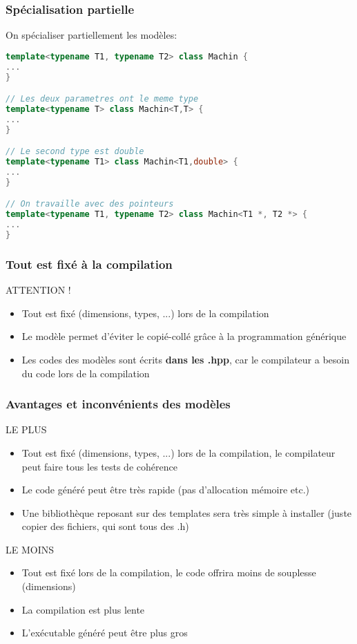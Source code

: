 \documentclass{beamer}
\begin{document}
\begin{frame}[fragile=singleslide,shrink=20]
\frametitle {Spécialisation partielle}

On spécialiser partiellement les modèles:

\begin{lstlisting}[language=c++]
template<typename T1, typename T2> class Machin {
...
}

// Les deux parametres ont le meme type
template<typename T> class Machin<T,T> {
...
}

// Le second type est double
template<typename T1> class Machin<T1,double> {
...
}

// On travaille avec des pointeurs
template<typename T1, typename T2> class Machin<T1 *, T2 *> {
...
}
\end{lstlisting}

\end{frame}

\begin{frame}
\frametitle {Tout est fixé à la compilation}

\begin{block}{ATTENTION !}
\begin{itemize}
\item{Tout est fixé (dimensions, types, ...) lors de la compilation}
\item{Le modèle permet d'éviter le copié-collé grâce à la programmation générique}
\item{Les codes des modèles sont écrits \textbf{dans les .hpp}, car le compilateur a besoin du code lors de la compilation}
\end{itemize}
\end{block}

\end{frame}

\begin{frame}
\frametitle {Avantages et inconvénients des modèles}

\begin{block}{LE PLUS}
\begin{itemize}
\item{Tout est fixé (dimensions, types, ...) lors de la compilation, le compilateur peut faire tous les tests de cohérence}
\item{Le code généré peut être très rapide (pas d'allocation mémoire etc.)}
\item{Une bibliothèque reposant sur des templates sera très simple à installer (juste copier des fichiers, qui sont tous des .h)}
\end{itemize}
\end{block}

\begin{block}{LE MOINS}
\begin{itemize}
\item{Tout est fixé lors de la compilation, le code offrira moins de souplesse (dimensions)}
\item{La compilation est plus lente}
\item{L'exécutable généré peut être plus gros}
\end{itemize}
\end{block}
\end{frame}
\end{document}
